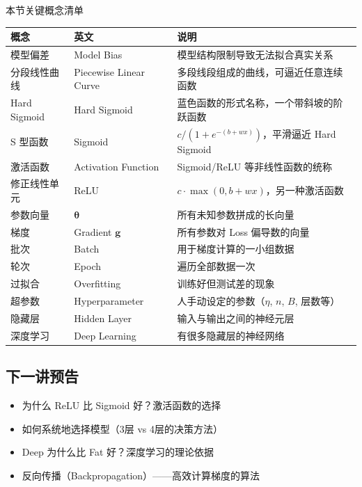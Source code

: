 \documentclass[a4paper]{article}
\begin{document}
\begin{knowledgebox}{本节关键概念清单}
    \begin{center}
    \begin{tabular}{lll}
        \toprule
        \textbf{概念} & \textbf{英文} & \textbf{说明} \\
        \midrule
        模型偏差 & Model Bias & 模型结构限制导致无法拟合真实关系 \\
        分段线性曲线 & Piecewise Linear Curve & 多段线段组成的曲线，可逼近任意连续函数 \\
        Hard Sigmoid & Hard Sigmoid & 蓝色函数的形式名称，一个带斜坡的阶跃函数 \\
        S 型函数 & Sigmoid & $c / (1 + e^{-(b+wx)})$，平滑逼近 Hard Sigmoid \\
        激活函数 & Activation Function & Sigmoid/ReLU 等非线性函数的统称 \\
        修正线性单元 & ReLU & $c \cdot \max(0, b+wx)$，另一种激活函数 \\
        参数向量 & $\boldsymbol{\theta}$ & 所有未知参数拼成的长向量 \\
        梯度 & Gradient $\boldsymbol{g}$ & 所有参数对 Loss 偏导数的向量 \\
        批次 & Batch & 用于梯度计算的一小组数据 \\
        轮次 & Epoch & 遍历全部数据一次 \\
        过拟合 & Overfitting & 训练好但测试差的现象 \\
        超参数 & Hyperparameter & 人手动设定的参数（$\eta$, $n$, $B$, 层数等） \\
        隐藏层 & Hidden Layer & 输入与输出之间的神经元层 \\
        深度学习 & Deep Learning & 有很多隐藏层的神经网络 \\
        \bottomrule
    \end{tabular}
    \end{center}
\end{knowledgebox}

\subsection{下一讲预告}

\begin{itemize}
    \item 为什么 ReLU 比 Sigmoid 好？激活函数的选择
    \item 如何系统地选择模型（3层 vs 4层的决策方法）
    \item Deep 为什么比 Fat 好？深度学习的理论依据
    \item 反向传播（Backpropagation）——高效计算梯度的算法
\end{itemize}
\end{document}
